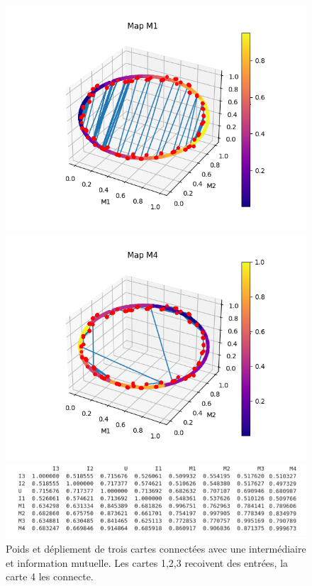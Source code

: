 \begin{figure}[h!]
\begin{minipage}{0.33\textwidth}
\includegraphics[width=\textwidth]{3som_star_dw1.png}
\end{minipage}
\begin{minipage}{0.33\textwidth}
\includegraphics[width=\textwidth]{3som_star_dw4.png}
\end{minipage}
\begin{minipage}{0.33\textwidth}
\includegraphics[width=\textwidth]{3som_star_im.png}
\end{minipage}
\label{fig:3som_star_dw}
\caption{Poids et dépliement de trois cartes connectées avec une intermédiaire et information mutuelle. Les cartes 1,2,3 recoivent des entrées, la carte 4 les connecte.}
\label{fig:3som_star}
\end{figure}

